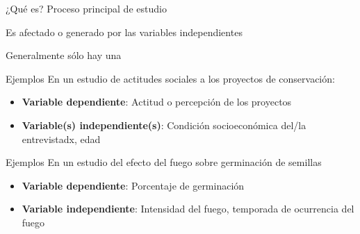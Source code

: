 \documentclass[
  11pt,
  ignorenonframetext,
]{beamer}
\begin{document}
\begin{frame}{¿Qué es?}
\protect\hypertarget{quuxe9-es}{}
Proceso principal de estudio

Es afectado o generado por las variables independientes

Generalmente sólo hay una
\end{frame}

\begin{frame}{Ejemplos}
\protect\hypertarget{ejemplos}{}
En un estudio de actitudes sociales a los proyectos de conservación:

\begin{itemize}
\item
  \textbf{Variable dependiente}: Actitud o percepción de los proyectos
\item
  \textbf{Variable(s) independiente(s)}: Condición socioeconómica del/la
  entrevistadx, edad
\end{itemize}
\end{frame}

\begin{frame}{Ejemplos}
\protect\hypertarget{ejemplos-1}{}
En un estudio del efecto del fuego sobre germinación de semillas

\begin{itemize}
\item
  \textbf{Variable dependiente}: Porcentaje de germinación
\item
  \textbf{Variable independiente}: Intensidad del fuego, temporada de
  ocurrencia del fuego
\end{itemize}
\end{frame}
\end{document}
